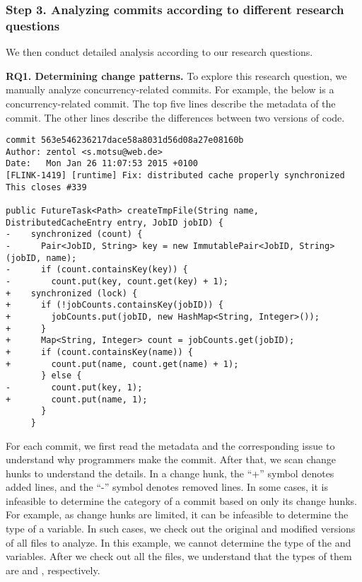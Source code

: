 \subsubsection{Step 3. Analyzing commits according to different research questions} We then conduct detailed analysis according to our research questions.

\textbf{RQ1. Determining change patterns.} To explore this research question, we manually analyze  concurrency-related commits. For example, the below is a concurrency-related commit. The top five lines describe the metadata of the commit. The other lines describe the differences between two versions of code.

\begin{lstlisting}
commit 563e546236217dace58a8031d56d08a27e08160b
Author: zentol <s.motsu@web.de>
Date:   Mon Jan 26 11:07:53 2015 +0100
[FLINK-1419] [runtime] Fix: distributed cache properly synchronized
This closes #339

public FutureTask<Path> createTmpFile(String name, DistributedCacheEntry entry, JobID jobID) {
-    synchronized (count) {
-      Pair<JobID, String> key = new ImmutablePair<JobID, String>(jobID, name);
-      if (count.containsKey(key)) {
-        count.put(key, count.get(key) + 1);
+    synchronized (lock) {
+      if (!jobCounts.containsKey(jobID)) {
+        jobCounts.put(jobID, new HashMap<String, Integer>());
+      }
+      Map<String, Integer> count = jobCounts.get(jobID);
+      if (count.containsKey(name)) {
+        count.put(name, count.get(name) + 1);
       } else {
-        count.put(key, 1);
+        count.put(name, 1);
       }
     }
\end{lstlisting}

For each commit, we first read the metadata and the corresponding issue to understand why programmers make the commit. After that, we scan change hunks to understand the details. In a change hunk, the ``+'' symbol denotes added lines, and the ``-'' symbol denotes removed lines. In some cases, it is infeasible to determine the category of a commit based on only its change hunks. For example, as change hunks are limited, it can be infeasible to determine the type of a variable. In such cases, we check out the original and modified versions of all files to analyze. In this example, we cannot determine the type of the  and  variables. After we check out all the files, we understand that the types of them are  and , respectively.

